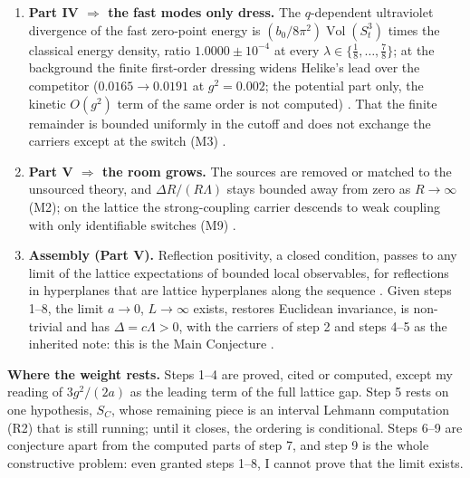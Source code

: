 \begin{enumerate}[leftmargin=18pt,itemsep=3pt,topsep=2pt]
Helike to the competitor at one identifiable $s^*(g^2)$, with registered
predictions $1.1674$, $1.1809$, $1.1931$ at $g^2=0.03$, $0.05$, $0.07$; its
rise with $g^2$ is the small-volume precursor of $0^{++}<2^{++}$
.
\item \textbf{Part IV $\Rightarrow$ the fast modes only dress.} The
$q$-dependent ultraviolet divergence of the fast zero-point energy is
$(b_0/8\pi^2)\operatorname{Vol}(S^3_t)$ times the classical energy density,
ratio $1.0000\pm10^{-4}$ at every $\lambda\in\{\tfrac18,\dots,\tfrac78\}$; at
the background the finite first-order dressing widens Helike's lead over the
competitor ($0.0165\to0.0191$ at $g^2=0.002$; the potential part only, the kinetic $O(g^2)$ term of the same order is not computed) . That the finite remainder is bounded uniformly in the cutoff
and does not exchange the carriers except at the switch (M3)
.
\item \textbf{Part V $\Rightarrow$ the room grows.} The sources are removed or
matched to the unsourced theory, and $\Delta R/(R\Lambda)$ stays bounded away
from zero as $R\to\infty$ (M2); on the lattice the strong-coupling carrier
descends to weak coupling with only identifiable switches (M9)
.
\item \textbf{Assembly (Part V).} Reflection positivity, a closed condition,
passes to any limit of the lattice expectations of bounded local observables,
for reflections in hyperplanes that are lattice hyperplanes along the sequence
. Given steps
1--8, the limit $a\to0$, $L\to\infty$ exists, restores Euclidean invariance,
is non-trivial and has $\Delta=c\Lambda>0$, with the carriers of step 2 and
steps 4--5 as the inherited note: this is the Main Conjecture
.
\end{enumerate}

\textbf{Where the weight rests.} Steps 1--4 are proved, cited or computed,
except my reading of $3g^2/(2a)$ as the leading term of the full lattice gap.
Step 5 rests on one hypothesis, $S_C$, whose remaining piece is an interval
Lehmann computation (R2) that is still running; until it closes, the ordering
is conditional. Steps 6--9 are conjecture apart from the computed parts of step 7, and step 9 is the whole constructive
problem: even granted steps 1--8, I cannot prove that the limit exists.

